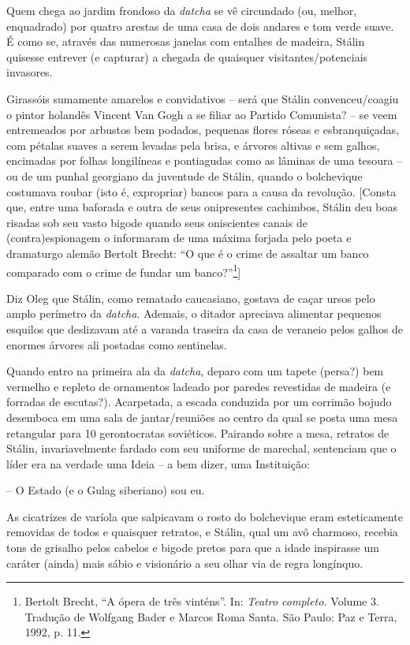 Quem chega ao jardim frondoso da \emph{datcha} se vê circundado (ou,
melhor, enquadrado) por quatro arestas de uma casa de dois andares e tom
verde suave. É como se, através das numerosas janelas com entalhes de
madeira, Stálin quisesse entrever (e capturar) a chegada de quaisquer
visitantes/potenciais invasores.

Girassóis sumamente amarelos e convidativos -- será que Stálin
convenceu/coagiu o pintor holandês Vincent Van Gogh a se filiar ao
Partido Comunista? -- se veem entremeados por arbustos bem podados,
pequenas flores róseas e esbranquiçadas, com pétalas suaves a serem
levadas pela brisa, e árvores altivas e sem galhos, encimadas por folhas
longilíneas e pontiagudas como as lâminas de uma tesoura -- ou de um
punhal georgiano da juventude de Stálin, quando o bolchevique costumava
roubar (isto é, expropriar) bancos para a causa da revolução. {[}Consta
que, entre uma baforada e outra de seus onipresentes cachimbos, Stálin
deu boas risadas sob seu vasto bigode quando seus oniscientes canais de
(contra)espionagem o informaram de uma máxima forjada pelo poeta e
dramaturgo alemão Bertolt Brecht: ``O que é o crime de assaltar um banco
comparado com o crime de fundar um banco?''\footnote{Bertolt Brecht, ``A
  ópera de três vinténs''. In: \emph{Teatro completo.} Volume 3.
  Tradução de Wolfgang Bader e Marcos Roma Santa. São Paulo: Paz e
  Terra, 1992, p. 11.}{]}

Diz Oleg que Stálin, como rematado caucasiano, gostava de caçar ursos
pelo amplo perímetro da \emph{datcha}. Ademais, o ditador apreciava
alimentar pequenos esquilos que deslizavam até a varanda traseira da
casa de veraneio pelos galhos de enormes árvores ali postadas como
sentinelas.

Quando entro na primeira ala da \emph{datcha}, deparo com um tapete
(persa?) bem vermelho e repleto de ornamentos ladeado por paredes
revestidas de madeira (e forradas de escutas?). Acarpetada, a escada
conduzida por um corrimão bojudo desemboca em uma sala de
jantar/reuniões ao centro da qual se posta uma mesa retangular para 10
gerontocratas soviéticos. Pairando sobre a mesa, retratos de Stálin,
invariavelmente fardado com seu uniforme de marechal, sentenciam que o
líder era na verdade uma Ideia -- a bem dizer, uma Instituição:

-- O Estado (e o Gulag siberiano) sou eu.

As cicatrizes de varíola que salpicavam o rosto do bolchevique eram
esteticamente removidas de todos e quaisquer retratos, e Stálin, qual um
avô charmoso, recebia tons de grisalho pelos cabelos e bigode pretos
para que a idade inspirasse um caráter (ainda) mais sábio e visionário a
seu olhar via de regra longínquo.

